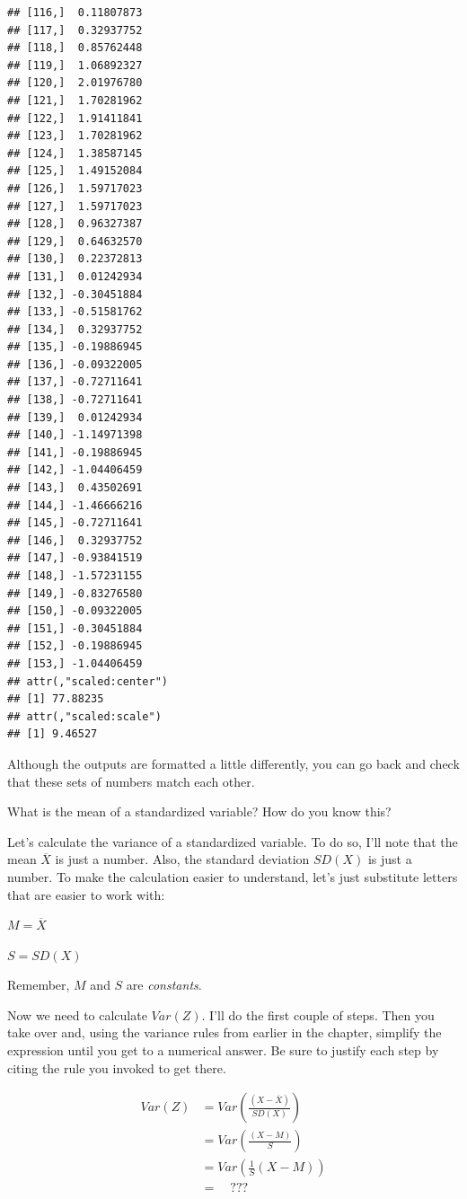 \documentclass[
]{book}
\begin{document}
\begin{verbatim}
## [116,]  0.11807873
## [117,]  0.32937752
## [118,]  0.85762448
## [119,]  1.06892327
## [120,]  2.01976780
## [121,]  1.70281962
## [122,]  1.91411841
## [123,]  1.70281962
## [124,]  1.38587145
## [125,]  1.49152084
## [126,]  1.59717023
## [127,]  1.59717023
## [128,]  0.96327387
## [129,]  0.64632570
## [130,]  0.22372813
## [131,]  0.01242934
## [132,] -0.30451884
## [133,] -0.51581762
## [134,]  0.32937752
## [135,] -0.19886945
## [136,] -0.09322005
## [137,] -0.72711641
## [138,] -0.72711641
## [139,]  0.01242934
## [140,] -1.14971398
## [141,] -0.19886945
## [142,] -1.04406459
## [143,]  0.43502691
## [144,] -1.46666216
## [145,] -0.72711641
## [146,]  0.32937752
## [147,] -0.93841519
## [148,] -1.57231155
## [149,] -0.83276580
## [150,] -0.09322005
## [151,] -0.30451884
## [152,] -0.19886945
## [153,] -1.04406459
## attr(,"scaled:center")
## [1] 77.88235
## attr(,"scaled:scale")
## [1] 9.46527
\end{verbatim}

Although the outputs are formatted a little differently, you can go back and check that these sets of numbers match each other.

What is the mean of a standardized variable? How do you know this?

Let's calculate the variance of a standardized variable. To do so, I'll note that the mean \(\overline{X}\) is just a number. Also, the standard deviation \(SD(X)\) is just a number. To make the calculation easier to understand, let's just substitute letters that are easier to work with:

\(M = \overline{X}\)

\(S = SD(X)\)

Remember, \(M\) and \(S\) are \emph{constants}.

Now we need to calculate \(Var(Z)\). I'll do the first couple of steps. Then you take over and, using the variance rules from earlier in the chapter, simplify the expression until you get to a numerical answer. Be sure to justify each step by citing the rule you invoked to get there.

\begin{align}
Var(Z) &= Var\left(\frac{\left(X - \overline{X}\right)}{SD(X)}\right) \\
    &= Var\left(\frac{\left(X - M\right)}{S}\right) \\
    &= Var\left(\frac{1}{S}\left(X - M\right)\right) \\
    &= \quad ???
\end{align}
\end{document}

